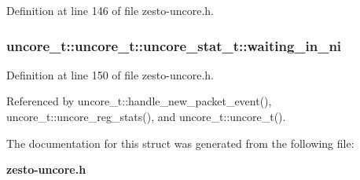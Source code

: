 Definition at line 146 of file zesto-uncore.h.
\subsubsection[{waiting\_\-in\_\-ni}]{ uncore\_\-t::uncore\_\-t::uncore\_\-stat\_\-t::waiting\_\-in\_\-ni}\label{structuncore__t_1_1uncore__stat__t_161e1d482e85fca69123a3735e9178f4}




Definition at line 150 of file zesto-uncore.h.

Referenced by uncore\_\-t::handle\_\-new\_\-packet\_\-event(), uncore\_\-t::uncore\_\-reg\_\-stats(), and uncore\_\-t::uncore\_\-t().

The documentation for this struct was generated from the following file:\begin{CompactItemize}
\item 
{\bf zesto-uncore.h}\end{CompactItemize}
